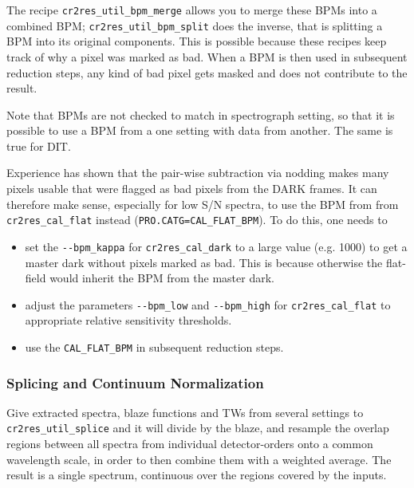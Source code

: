 The recipe \texttt{cr2res\_util\_bpm\_merge} allows you to merge these BPMs into
a combined BPM; \linebreak\texttt{cr2res\_util\_bpm\_split} does the inverse,
that is splitting a BPM into its original components. This is possible because
these recipes keep track of why a pixel was marked as bad. When a BPM is then
used in subsequent reduction steps, any kind of bad pixel gets masked and does
not contribute to the result.

Note that BPMs are not checked to match in spectrograph setting, so that it is
possible to use a BPM from a one setting with data from another. The same is
true for DIT.

Experience has shown that the pair-wise subtraction via nodding makes many
pixels usable that were flagged as bad pixels from the DARK frames. It can
therefore make sense, especially for low S/N spectra, to use the BPM from from
\texttt{cr2res\_cal\_flat} instead (\verb!PRO.CATG=CAL_FLAT_BPM!). To do this,
one needs to
\begin{itemize}
    \item set the \verb!--bpm_kappa! for \texttt{cr2res\_cal\_dark} to a large value (e.g. 1000) to get a master dark without pixels marked as bad. This is because otherwise the flat-field would inherit the BPM from the master dark.
    \item adjust the parameters \verb!--bpm_low! and \verb!--bpm_high! for \texttt{cr2res\_cal\_flat} to appropriate relative sensitivity thresholds.
    \item use the \verb!CAL_FLAT_BPM! in subsequent reduction steps.
\end{itemize}

\subsubsection{Splicing and Continuum Normalization}

Give extracted spectra, blaze functions and TWs from several settings to
\texttt{cr2res\_util\_splice} and it will divide by the blaze, and resample the
overlap regions between all spectra from individual detector-orders onto a
common wavelength scale, in order to then combine them with a weighted average.
The result is a single spectrum, continuous over the regions covered by the
inputs.

